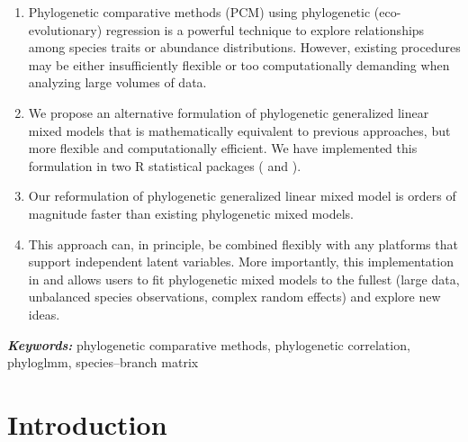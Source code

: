 \documentclass[12pt]{article}
\providecommand{\keywords}[1]{\textbf{\textit{Keywords:}} #1}
\begin{document}
\begin{enumerate}
\item{Phylogenetic comparative methods (PCM) using phylogenetic (eco-evolutionary) regression is a powerful technique to explore relationships among species traits or abundance distributions. However, existing procedures may be either insufficiently flexible or too computationally demanding when analyzing large volumes of data.}
\item{We propose an alternative formulation of phylogenetic generalized linear mixed models that is mathematically equivalent to previous approaches, but more flexible and computationally efficient. We have implemented this formulation in two R statistical packages ( and ).}
\item{Our reformulation of phylogenetic generalized linear mixed model is orders of magnitude faster than existing phylogenetic mixed models.}
\item{This approach can, in principle, be combined flexibly with any platforms that support independent latent variables.
More importantly, this implementation in  and  allows users to fit phylogenetic mixed models to the fullest (large data, unbalanced species observations, complex random effects) and explore new ideas.}
\end{enumerate}



\keywords{phylogenetic comparative methods, phylogenetic correlation, phyloglmm, species--branch matrix}


\doublespacing

\section*{Introduction}
\end{document}
